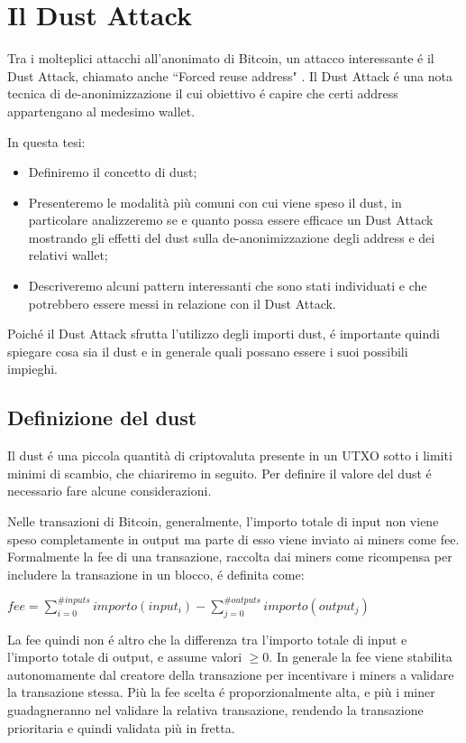 \chapter{Il Dust Attack}
Tra i molteplici attacchi all'anonimato di Bitcoin, un attacco interessante é il Dust Attack, chiamato anche ``Forced reuse address" \cite{dst_att_def}. Il Dust Attack é una nota tecnica di de-anonimizzazione il cui obiettivo é capire che certi address appartengano al medesimo wallet.

In questa tesi:
\begin{itemize}
\item Definiremo il concetto di dust;
    \item Presenteremo le modalità più comuni con cui viene speso il dust, in particolare analizzeremo se e quanto possa essere efficace un Dust Attack mostrando gli effetti del dust sulla de-anonimizzazione degli address e dei relativi wallet;
    \item Descriveremo alcuni pattern interessanti che sono stati individuati e che potrebbero essere messi in relazione con il  Dust Attack.
\end{itemize}

Poiché il Dust Attack sfrutta l'utilizzo degli importi dust, é importante quindi spiegare cosa sia il dust e in generale quali possano essere i suoi possibili impieghi.

\section{Definizione del dust}
Il dust é una piccola quantità di criptovaluta presente in un UTXO sotto i limiti minimi di scambio, che chiariremo in seguito. Per definire il valore del dust é necessario fare alcune considerazioni.

Nelle transazioni di Bitcoin, generalmente, l'importo totale di input non viene speso completamente in output ma parte di esso viene inviato ai miners come fee. Formalmente la fee di una transazione, raccolta dai miners come ricompensa per includere la transazione in un blocco, é definita come:
\begin{center}
    $fee = \sum_{i=0}^{\#inputs} importo(input_i) - \sum_{j=0}^{\#outputs} importo(output_j)$
\end{center}
La fee quindi non é altro che la differenza tra l'importo totale di input e l'importo totale di output, e assume valori $\ge 0$. In generale la fee viene stabilita autonomamente dal creatore della transazione per incentivare i miners a validare la transazione stessa. Più la fee scelta é proporzionalmente alta, e più i miner guadagneranno nel validare la relativa transazione, rendendo la transazione prioritaria e quindi validata più in fretta.


